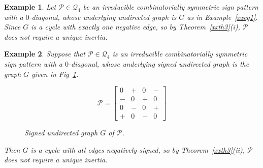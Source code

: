\documentclass[10pt,a4paper]{amsart}
\newtheorem{eg}{Example}[section]
\numberwithin{equation}{section}
\begin{document}
\begin{eg}
	Let $\mathcal{P}\in \mathcal{Q}_4$ be an irreducible combinatorially symmetric sign pattern with a $0$-diagonal, whose underlying undirected graph is $G$ as in Example~\ref{xxeg1}. Since $G$ is a cycle with exactly one negative edge, so by Theorem~\ref{xxth3}(i), $\mathcal{P}$ does not require a unique inertia.
\end{eg}

\begin{eg} Suppose that $\mathcal{P}\in \mathcal{Q}_4$ is an irreducible combinatorially symmetric sign pattern with a $0$-diagonal, whose underlying signed undirected graph is the graph $G$ given in Fig~\ref{xfig3.3}.
	\begin{figure}[H]
		\centering
		\begin{minipage}{.45\textwidth}
			\vspace{-1cm}
			\[
			\mathcal{P}=
			\begin{bmatrix}
				0 & + & 0 & - \\
				- & 0 & + & 0 \\
				0 & - & 0 & + \\
				+ & 0 & - & 0
			\end{bmatrix}
			\]
		\end{minipage}
		\hspace{0.05\textwidth}
		\begin{minipage}{.45\textwidth}
			\centering
			\tikzset{node distance=1cm}
			\caption{Signed undirected graph $ G$ of $\mathcal{P}$.}
			\label{xfig3.3}
		\end{minipage}
	\end{figure}
	
	Then $G$ is a cycle with all edges negatively signed, so by Theorem~\ref{xxth3}(ii), $\mathcal{P}$ does not require a unique inertia.
\end{eg}
\end{document}
